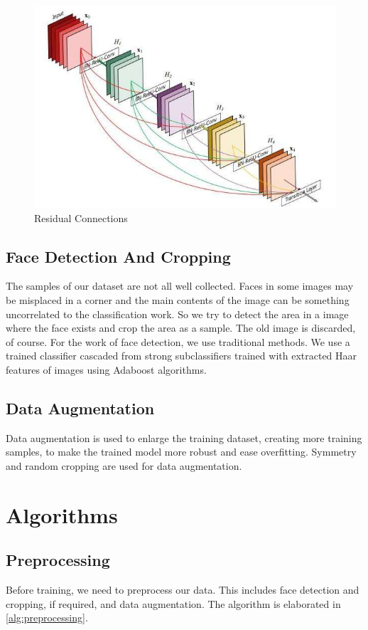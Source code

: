 \documentclass[journal, onecolumn]{IEEEtran}
\begin{document}
\begin{figure}
  \centering
  \includegraphics[width=.45\textwidth]{ResNet_the.jpg}
  \caption{Residual Connections}
  \label{fig:ResNetArch}
\end{figure}

\subsection{Face Detection And Cropping}
The samples of our dataset are not all well collected. Faces in some images may be misplaced in a corner and the main contents of the image can be something uncorrelated to the classification work. So we try to detect the area in a image where the face exists and crop the area as a sample. The old image is discarded, of course.
For the work of face detection, we use traditional methods. We use a trained classifier cascaded from strong subclassifiers trained with extracted Haar features of images using Adaboost algorithms.

\subsection{Data Augmentation}
Data augmentation is used to enlarge the training dataset, creating more training samples, to make the trained model more robust and ease overfitting. Symmetry and random cropping are used for data augmentation.


\section{Algorithms}

\subsection{Preprocessing}
Before training, we need to preprocess our data. This includes face detection and cropping, if required, and data augmentation. The algorithm is elaborated in \ref{alg:preprocessing}.
\end{document}
